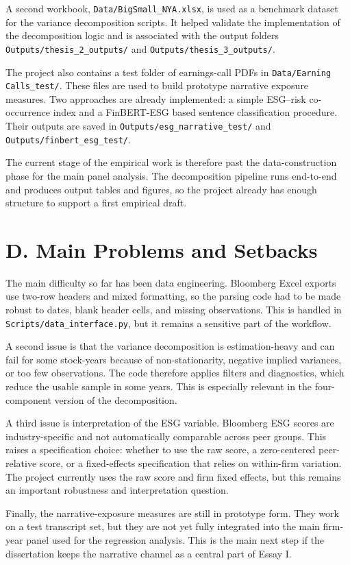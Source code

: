 \documentclass[12pt]{article}
\begin{document}
A second workbook, \texttt{Data/BigSmall\_NYA.xlsx}, is used as a benchmark dataset for the variance decomposition scripts. It helped validate the implementation of the decomposition logic and is associated with the output folders \texttt{Outputs/thesis\_2\_outputs/} and \texttt{Outputs/thesis\_3\_outputs/}.

The project also contains a test folder of earnings-call PDFs in \texttt{Data/Earning Calls\_test/}. These files are used to build prototype narrative exposure measures. Two approaches are already implemented: a simple ESG--risk co-occurrence index and a FinBERT-ESG based sentence classification procedure. Their outputs are saved in \texttt{Outputs/esg\_narrative\_test/} and \texttt{Outputs/finbert\_esg\_test/}.

The current stage of the empirical work is therefore past the data-construction phase for the main panel analysis. The decomposition pipeline runs end-to-end and produces output tables and figures, so the project already has enough structure to support a first empirical draft.

\section*{D. Main Problems and Setbacks}
The main difficulty so far has been data engineering. Bloomberg Excel exports use two-row headers and mixed formatting, so the parsing code had to be made robust to dates, blank header cells, and missing observations. This is handled in \texttt{Scripts/data\_interface.py}, but it remains a sensitive part of the workflow.

A second issue is that the variance decomposition is estimation-heavy and can fail for some stock-years because of non-stationarity, negative implied variances, or too few observations. The code therefore applies filters and diagnostics, which reduce the usable sample in some years. This is especially relevant in the four-component version of the decomposition.

A third issue is interpretation of the ESG variable. Bloomberg ESG scores are industry-specific and not automatically comparable across peer groups. This raises a specification choice: whether to use the raw score, a zero-centered peer-relative score, or a fixed-effects specification that relies on within-firm variation. The project currently uses the raw score and firm fixed effects, but this remains an important robustness and interpretation question.

Finally, the narrative-exposure measures are still in prototype form. They work on a test transcript set, but they are not yet fully integrated into the main firm-year panel used for the regression analysis. This is the main next step if the dissertation keeps the narrative channel as a central part of Essay I.
\end{document}
